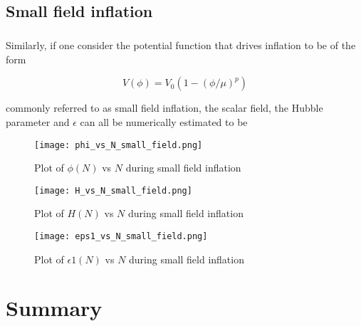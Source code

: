 \documentclass[12pt,a4paper,oneside]{book}
\begin{document}
\section{Small field inflation}

\paragraph*{} Similarly, if one consider the potential function that drives inflation to be of the form

\begin{equation}
V(\phi) = V_0(1-(\phi/\mu)^p)
\end{equation}

\noindent commonly referred to as small field inflation, the scalar field, the Hubble parameter and $\epsilon$ can all be numerically estimated to be

\begin{figure}
\begin{center}
\texttt{[image: phi\_vs\_N\_small\_field.png]}
\caption[Plot of $\phi(N)$ vs $N$ during small field inflation]{Plot of $\phi(N)$ vs $N$ during small field inflation}
\label{blah}
\end{center}
\end{figure}

\begin{figure}
\begin{center}
\texttt{[image: H\_vs\_N\_small\_field.png]}
\caption[Plot of $H(N)$ vs $N$ during small field inflation]{Plot of $H(N)$ vs $N$ during small field inflation}
\label{blah}
\end{center}
\end{figure}

\begin{figure}
\begin{center}
\texttt{[image: eps1\_vs\_N\_small\_field.png]}
\caption[Plot of $\epsilon 1(N)$ vs $N$ during small field inflation]{Plot of $\epsilon 1(N)$ vs $N$ during small field inflation}
\label{blah}
\end{center}
\end{figure}


\chapter{Summary}

\end{document}
